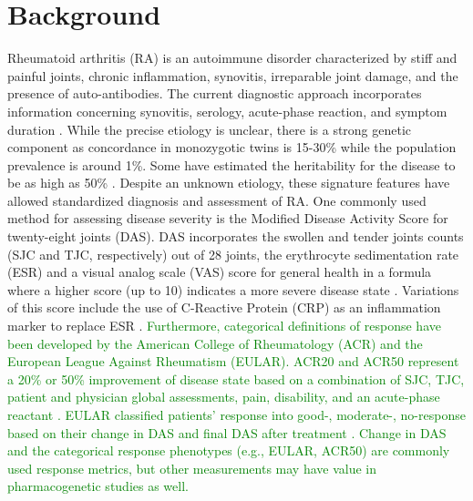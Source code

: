 
\section*{Background}

Rheumatoid arthritis (RA) is an autoimmune disorder characterized by stiff and painful joints, chronic inflammation, synovitis, irreparable joint damage, and the presence of auto-antibodies. The current diagnostic approach incorporates information concerning synovitis, serology, acute-phase reaction, and symptom duration \cite{aletaha_2010_2010,radner_performance_2014}. While the precise etiology is unclear, there is a strong genetic component as concordance in monozygotic twins is 15-30\% while the population prevalence is around 1\%. Some have estimated the heritability for the disease to be as high as 50\% \cite{perricone_overview_2011,mcinnes_pathogenesis_2011}. Despite an unknown etiology, these signature features have allowed standardized diagnosis and assessment of RA. One commonly used method for assessing disease severity is the Modified Disease Activity Score for twenty-eight joints (DAS). DAS incorporates the swollen and tender joints counts (SJC and TJC, respectively) out of 28 joints, the erythrocyte sedimentation rate (ESR) and a visual analog scale (VAS) score for general health in a formula where a higher score (up to 10) indicates a more severe disease state \cite{van_der_heijde_judging_1990,prevoo_modified_1995}. Variations of this score include the use of C-Reactive Protein (CRP) as an inflammation marker to replace ESR \cite{skogh_twenty_2003,fransen_disease_2003}. \textcolor{green}{Furthermore, categorical definitions of response have been developed by the American College of Rheumatology (ACR) and the European League Against Rheumatism (EULAR). ACR20 and ACR50 represent a 20\% or 50\% improvement of disease state based on a combination of SJC, TJC, patient and physician global assessments, pain, disability, and an acute-phase reactant \cite{felson_american_1995,felson_american_2011}. EULAR classified patients' response into good-, moderate-, no-response based on their change in DAS and final DAS after treatment \cite{fransen_disease_2005}. Change in DAS and the categorical response phenotypes (e.g., EULAR, ACR50) are commonly used response metrics, but other measurements may have value in pharmacogenetic studies as well.}

